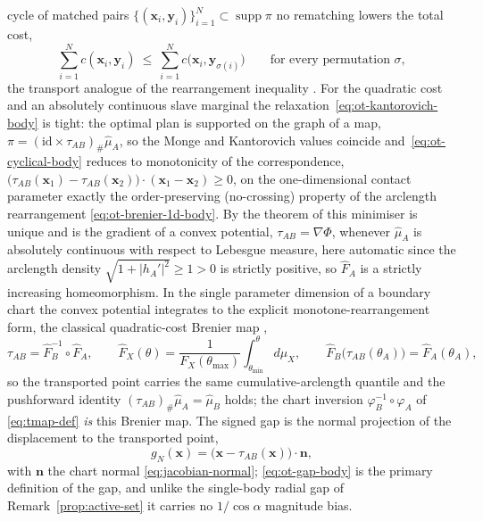 \documentclass{svjour3}                 %
\newcommand{\abs}[1]{\lvert#1\rvert}
\newcommand{\nbf}{\bm{n}}
\newcommand{\xbf}{\bm{x}}
\newcommand{\ybf}{\bm{y}}
\newcommand{\gn}{g_{\scriptscriptstyle N}}
\newcommand{\tmap}{\tau_{AB}}
\newcommand{\map}[1]{\varphi_{#1}}
\newcommand{\grad}{\nabla}
\begin{document}
cycle of matched pairs $\{(\xbf_i,\ybf_i)\}_{i=1}^{N}\subset\operatorname{supp}\pi$ no rematching lowers the
total cost,
\begin{equation}\label{eq:ot-cyclical-body}
\sum_{i=1}^{N} c(\xbf_i,\ybf_i)\ \le\ \sum_{i=1}^{N} c\big(\xbf_i,\ybf_{\sigma(i)}\big)
\qquad\text{for every permutation }\sigma ,
\end{equation}
the transport analogue of the rearrangement inequality \citep{villani2009optimal,santambrogio2015optimal}. For
the quadratic cost and an absolutely continuous slave marginal the relaxation~\eqref{eq:ot-kantorovich-body} is
tight: the optimal plan is supported on the graph of a map, $\pi=(\mathrm{id}\times\tmap)_\#\hat\mu_A$, so the
Monge and Kantorovich values coincide and~\eqref{eq:ot-cyclical-body} reduces to monotonicity of the
correspondence, $\big(\tmap(\xbf_1)-\tmap(\xbf_2)\big)\cdot(\xbf_1-\xbf_2)\ge0$, on the one-dimensional
contact parameter exactly the order-preserving (no-crossing) property of the arclength rearrangement
\eqref{eq:ot-brenier-1d-body}. By the theorem of
\citet{brenier1991polar,mccann1995existence} this minimiser is unique and is the gradient of a convex potential,
$\tmap=\grad\Phi$, whenever $\hat\mu_A$ is absolutely continuous with respect to Lebesgue measure, here
automatic since the arclength density $\sqrt{1+\abs{h_A'}^2}\ge1>0$ is strictly positive, so $\hat F_A$ is a
strictly increasing homeomorphism. In the single parameter dimension of a boundary chart the convex potential
integrates to the explicit monotone-rearrangement form, the classical quadratic-cost Brenier map
\citep[Thm.~2.5]{santambrogio2015optimal}\citep{mccann1995existence},
\begin{equation}\label{eq:ot-brenier-1d-body}
\tmap=\hat F_B^{-1}\circ\hat F_A,\qquad \hat F_X(\theta)=\frac{1}{F_X(\theta_{\max})}\int_{\theta_{\min}}^{\theta}d\mu_X,\qquad
\hat F_B\big(\tmap(\theta_A)\big)=\hat F_A(\theta_A),
\end{equation}
so the transported point carries the same cumulative-arclength quantile and the pushforward identity
$(\tmap)_\#\hat\mu_A=\hat\mu_B$ holds; the chart inversion $\map{B}^{-1}\circ\map{A}$ of \eqref{eq:tmap-def}
\emph{is} this Brenier map. The signed gap is the normal projection of the displacement to the transported
point,
\begin{equation}\label{eq:ot-gap-body}
\gn(\xbf)=\big(\xbf-\tmap(\xbf)\big)\!\cdot\!\nbf ,
\end{equation}
with $\nbf$ the chart normal \eqref{eq:jacobian-normal}; \eqref{eq:ot-gap-body} is the primary definition of the
gap, and unlike the single-body radial gap of Remark~\ref{prop:active-set} it carries no $1/\cos\alpha$ magnitude
bias.
\end{document}
